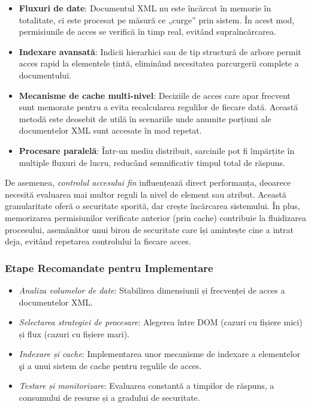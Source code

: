 \documentclass[runningheads]{llncs}
\begin{document}
\begin{itemize}
   \item \textbf{Fluxuri de date}: Documentul XML nu este încărcat în memorie în totalitate, ci este procesat pe măsură ce „curge” prin sistem. În acest mod, permisiunile de acces se verifică în timp real, evitând supraîncărcarea.
   \item \textbf{Indexare avansată}: Indicii hierarhici sau de tip structură de arbore permit acces rapid la elementele țintă, eliminând necesitatea parcurgerii complete a documentului.
   \item \textbf{Mecanisme de cache multi-nivel}: Deciziile de acces care apar frecvent sunt memorate pentru a evita recalcularea regulilor de fiecare dată. Această metodă este deosebit de utilă în scenariile unde anumite porțiuni ale documentelor XML sunt accesate în mod repetat.
   \item \textbf{Procesare paralelă}: Într-un mediu distribuit, sarcinile pot fi împărțite în multiple fluxuri de lucru, reducând semnificativ timpul total de răspuns.
\end{itemize}

\noindent
De asemenea, \textit{controlul accesului fin} influențează direct performanța, deoarece necesită evaluarea mai multor reguli la nivel de element sau atribut. Această granularitate oferă o securitate sporită, dar crește încărcarea sistemului. În plus, memorizarea permisiunilor verificate anterior (prin cache) contribuie la fluidizarea procesului, asemănător unui birou de securitate care își amintește cine a intrat deja, evitând repetarea controlului la fiecare acces.

\subsubsection{Etape Recomandate pentru Implementare}

\begin{itemize}
   \item \textit{Analiza volumelor de date}: Stabilirea dimensiunii și frecvenței de acces a documentelor XML.
   \item \textit{Selectarea strategiei de procesare}: Alegerea între DOM (cazuri cu fișiere mici) și flux (cazuri cu fișiere mari).
   \item \textit{Indexare și cache}: Implementarea unor mecanisme de indexare a elementelor şi a unui sistem de cache pentru regulile de acces.
   \item \textit{Testare și monitorizare}: Evaluarea constantă a timpilor de răspuns, a consumului de resurse și a gradului de securitate.
\end{itemize}
\end{document}
